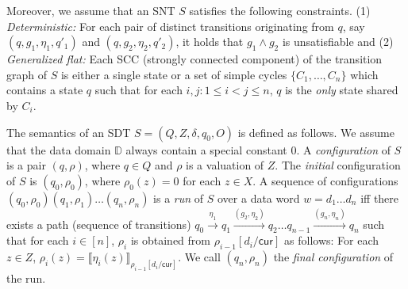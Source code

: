 \documentclass[runningheads,a4paper]{llncs}
\newcommand{\eval}[2]{\llbracket#1\rrbracket_{#2}}
\newcommand\cur{\mathsf{cur}}
\newcommand\dom{\mathsf{dom}}
\newcommand\dd{\mathbb{D}}
\begin{document}
{Moreover, we assume that an SNT $S$ satisfies the following constraints. (1) \emph{Deterministic:} For each pair of distinct transitions originating from $q$, say $(q, g_1, \eta_1,q'_1)$ and $(q, g_2,\eta_2,q'_2)$, it holds that $g_1 \wedge g_2$ is unsatisfiable and (2) \emph{Generalized flat:} Each SCC (strongly connected component) of the transition graph of $S$ is either a single state or a set of simple cycles $\{C_1,\dots, C_n\}$ which contains a state $q$ such that for each $i,j: 1 \le i < j \le n$, $q$ is the \emph{only} state shared by $C_i$.
}


The semantics of an SDT $S = (Q, Z, \delta, q_0, O)$  is defined as follows. We assume that the data domain $\dd$ always contain a special constant $0$. A \emph{configuration} of $S$ is a pair $(q, \rho)$, where $q \in Q$ and $\rho$ is a valuation of $Z$. The \emph{initial} configuration of $S$ is $(q_0,\rho_0)$, where $\rho_0(z)=0$ for each $z \in X$. A sequence of configurations $(q_0,\rho_0)(q_1,\rho_1)\ldots(q_n,\rho_n)$ is
a \emph{run} of $S$ over a data word $w=d_1 \dots d_n$ iff there exists a path (sequence of transitions) $q_0 \xrightarrow{\eta_1} q_1 \xrightarrow{(g_2,\eta_2)} q_2 \dots q_{n-1} \xrightarrow{(g_n, \eta_n)} q_n$ such that for each $i \in [n]$, $\rho_i$ is obtained from $\rho_{i-1}[d_i/\cur]$ as follows: For each $z \in Z$, $\rho_i(z)=\eval{\eta_i(z)}{\rho_{i-1}[d_i/\cur]}$.
We call $(q_n,\rho_n)$ the \emph{final configuration} of the run. %

\end{document}
